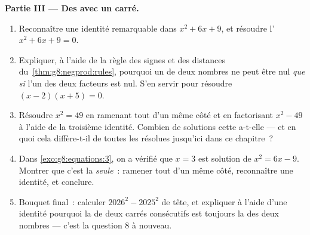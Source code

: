 \begin{problem}[{Devoir maison --- $(a+b)^2$, $(a-b)^2$,
$(a+b)(a-b)$, et la somme $1 + 3 + 5 + \dots + (2n-1) = n^2$}]
\medskip
\noindent\textbf{Partie III --- Des  avec un carré.}
\begin{enumerate}[resume]
  \item Reconnaître une identité remarquable dans $x^2 + 6x + 9$, et
        résoudre l' $x^2 + 6x + 9 = 0$.
  \item Expliquer, à l'aide de la règle des signes et des distances
        du~\cref{thm:g8:negprod:rules}, pourquoi un  de deux
        nombres ne peut être nul \emph{que si} l'un des deux
        facteurs est nul. S'en servir pour résoudre
        $(x - 2)(x + 5) = 0$.
  \item Résoudre $x^2 = 49$ en ramenant tout d'un même côté et en
        factorisant $x^2 - 49$ à l'aide de la troisième identité.
        Combien de solutions cette  a-t-elle --- et en quoi
        cela diffère-t-il de toutes les  résolues jusqu'ici
        dans ce chapitre~?
  \item Dans \cref{exo:g8:equations:3}, on a vérifié que $x = 3$ est
        solution de $x^2 = 6x - 9$. Montrer que c'est la
        \emph{seule}~: ramener tout d'un même côté, reconnaître une
        identité, et conclure.
  \item Bouquet final~: calculer $2026^2 - 2025^2$ de tête, et
        expliquer à l'aide d'une identité pourquoi la  de
        deux carrés consécutifs est toujours la  des deux
        nombres --- c'est la question 8 à nouveau.
\end{enumerate}
\end{problem}
